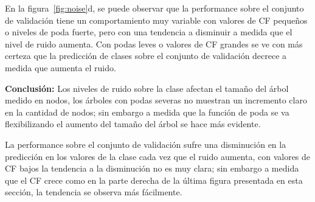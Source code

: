 En la figura~\ref{fig:noise}d,
se puede observar que la performance sobre el conjunto de validación tiene un
comportamiento muy variable con valores de CF pequeños o niveles de poda fuerte, pero
con una tendencia a disminuir a medida que el nivel de ruido aumenta. Con podas leves
o valores de CF grandes se ve con más certeza que la predicción de clases sobre el
conjunto de validación decrece a medida que aumenta el ruido.

\textbf{Conclusión:} Los niveles de ruido sobre la clase afectan el tamaño del árbol medido en
nodos, los árboles con podas severas no muestran un incremento claro en la cantidad de
nodos; sin embargo a medida que la función de poda se va flexibilizando el aumento del
tamaño del árbol se hace más evidente.

La performance sobre el conjunto de validación sufre una disminución en la predicción en
los valores de la clase cada vez que el ruido aumenta, con valores de CF bajos la
tendencia a la disminución no es muy clara; sin embargo a medida que el CF crece como
en la parte derecha de la última figura presentada en esta sección, la tendencia se
observa más fácilmente.


